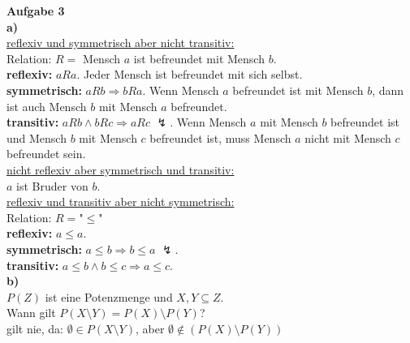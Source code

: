 \documentclass[a4paper]{scrartcl}
\begin{document}
	\begin{flushleft}
		\textbf{Aufgabe 3}\\
		\textbf{a)} \\
		\underline{reflexiv und symmetrisch aber nicht transitiv:}\\
		Relation: $R =$ Mensch $a$ ist befreundet mit Mensch $b$.\\
		\textbf{reflexiv:} $aRa$. Jeder Mensch ist befreundet mit sich selbst.\\
		\textbf{symmetrisch:} $aRb \Rightarrow bRa$. Wenn Mensch $a$ befreundet ist mit Mensch $b$, dann ist auch Mensch $b$ mit Mensch $a$ befreundet.\\
		\textbf{transitiv:} $aRb \wedge bRc\Rightarrow aRc$ $\mathbb{\lightning}$. Wenn Mensch $a$ mit Mensch $b$ befreundet ist und Mensch $b$ mit Mensch $c$ befreundet ist, muss Mensch $a$ nicht mit Mensch $c$ befreundet sein.\\[1em]
		\underline{nicht reflexiv aber symmetrisch und transitiv:}\\
		$a$ ist Bruder von $b$.\\[1em]
		\underline{reflexiv und transitiv aber nicht symmetrisch:}\\
		Relation: $R=$"$\le$"\\
		\textbf{reflexiv:} $a\le a$.\\
		\textbf{symmetrisch:} $a\le b \Rightarrow b\le a$ $\mathbb{\lightning}$.\\
		\textbf{transitiv:} $a\le b \wedge b\le c\Rightarrow a\le c$.\\[1em]

		\textbf{b)} \\
		$P(Z)$ ist eine Potenzmenge und $X,Y \subseteq Z$.\\
		Wann gilt $P(X\setminus Y)=P(X)\setminus P(Y)$?\\
		gilt nie, da: $\emptyset \in P(X\setminus Y)$, aber $\emptyset \notin (P(X)\setminus P(Y))$\\[1em]
		
 	\end{flushleft}
\end{document}
